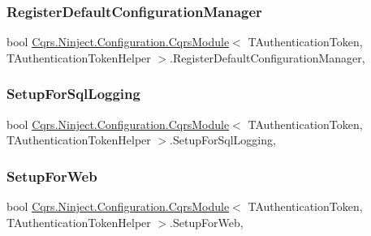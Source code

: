 \subsubsection{\texorpdfstring{Register\+Default\+Configuration\+Manager}{RegisterDefaultConfigurationManager}}
{\footnotesize\ttfamily bool \hyperlink{classCqrs_1_1Ninject_1_1Configuration_1_1CqrsModule}{Cqrs.\+Ninject.\+Configuration.\+Cqrs\+Module}$<$ T\+Authentication\+Token, T\+Authentication\+Token\+Helper $>$.Register\+Default\+Configuration\+Manager\hspace{0.3cm}{\ttfamily [get]}, {\ttfamily [protected]}}

\mbox{\label{classCqrs_1_1Ninject_1_1Configuration_1_1CqrsModule_a10e7a8adbe03fc05ebb7003727cbe541_a10e7a8adbe03fc05ebb7003727cbe541}} 
\subsubsection{\texorpdfstring{Setup\+For\+Sql\+Logging}{SetupForSqlLogging}}
{\footnotesize\ttfamily bool \hyperlink{classCqrs_1_1Ninject_1_1Configuration_1_1CqrsModule}{Cqrs.\+Ninject.\+Configuration.\+Cqrs\+Module}$<$ T\+Authentication\+Token, T\+Authentication\+Token\+Helper $>$.Setup\+For\+Sql\+Logging\hspace{0.3cm}{\ttfamily [get]}, {\ttfamily [protected]}}

\mbox{\label{classCqrs_1_1Ninject_1_1Configuration_1_1CqrsModule_ae4bbc2d44f283644a328d308dc78edc5_ae4bbc2d44f283644a328d308dc78edc5}} 
\subsubsection{\texorpdfstring{Setup\+For\+Web}{SetupForWeb}}
{\footnotesize\ttfamily bool \hyperlink{classCqrs_1_1Ninject_1_1Configuration_1_1CqrsModule}{Cqrs.\+Ninject.\+Configuration.\+Cqrs\+Module}$<$ T\+Authentication\+Token, T\+Authentication\+Token\+Helper $>$.Setup\+For\+Web\hspace{0.3cm}{\ttfamily [get]}, {\ttfamily [protected]}}

